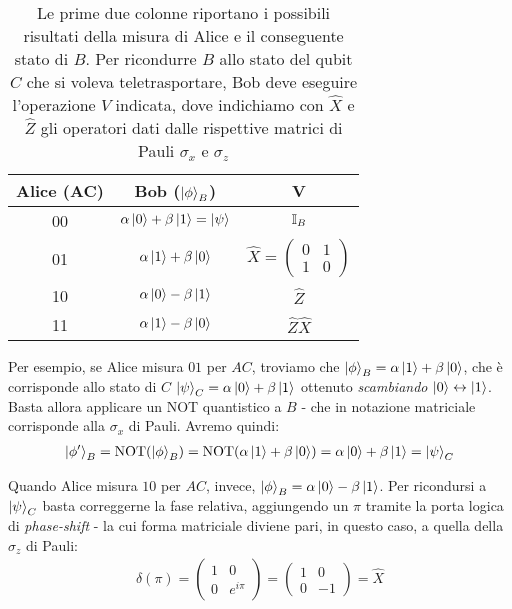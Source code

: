 \documentclass[../../InformazioneQuantistica.tex]{subfiles}
\begin{document}
\begin{table}[H]
\centering
\begin{tabular}{ccc}\toprule
Alice (AC) & Bob ($\Ket{\phi}_B$) & V \\ \midrule
00 & $\alpha\Ket{0}+\beta\Ket{1}=\Ket{\psi}$ & $\mathbb{I}_B$ \\
01 & $\alpha\Ket{1}+\beta\Ket{0}$ & $\hat{X}=\begin{pmatrix}0 & 1\\1 & 0 \end{pmatrix}$ \\
10 & $\alpha\Ket{0}-\beta\Ket{1}$ & $\hat{Z}$ \\
11 & $\alpha\Ket{1}-\beta\Ket{0}$ & $\hat{Z}\hat{X}$ \\ \bottomrule
\end{tabular}
\caption{Le prime due colonne riportano i possibili risultati della misura di Alice e il conseguente stato di $B$. Per ricondurre $B$ allo stato del qubit $C$ che si voleva teletrasportare, Bob deve eseguire l'operazione $V$ indicata, dove indichiamo con $\hat{X}$ e $\hat{Z}$ gli operatori dati dalle rispettive matrici di Pauli $\sigma_x$ e $\sigma_z$\label{tab:teletrasporto-quantistico}}
\end{table}

Per esempio, se Alice misura $01$ per $AC$, troviamo che $\Ket{\phi}_B = \alpha\Ket{1} + \beta\Ket{0}$, che è corrisponde allo stato di $C$ $\Ket{\psi}_C = \alpha\Ket{0} + \beta\Ket{1}$ ottenuto \textit{scambiando} $\Ket{0}\leftrightarrow \Ket{1}$. Basta allora applicare un NOT quantistico a $B$ - che in notazione matriciale corrisponde alla $\sigma_x$ di Pauli. Avremo quindi:
\begin{align*}
\Ket{\phi'}_B = \operatorname{NOT}(\Ket{\phi}_B) = \operatorname{NOT}(\alpha\Ket{1}+\beta\Ket{0})=\alpha \Ket{0}+ \beta\Ket{1} = \Ket{\psi}_C
\end{align*}

Quando Alice misura $10$ per $AC$, invece, $\Ket{\phi}_B = \alpha\Ket{0} -\beta\Ket{1}$. Per ricondursi a $\Ket{\psi}_C$ basta correggerne la fase relativa, aggiungendo un $\pi$ tramite la porta logica di \textit{phase-shift} - la cui forma matriciale diviene pari, in questo caso, a quella della $\sigma_z$ di Pauli:
\begin{align*}
\delta(\pi) = \begin{pmatrix}1 & 0\\0& e^{i\pi}\end{pmatrix} =\begin{pmatrix} 1 & 0\\ 0 & -1\end{pmatrix} =\hat{X}
\end{align*}
\end{document}
